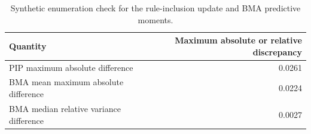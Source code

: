 \begin{table}[htbp]
\centering
\caption{Synthetic enumeration check for the rule-inclusion update and BMA predictive moments.}
\label{tab:synthetic}
\scriptsize
\begin{tabular}{lr}
\toprule
Quantity & Maximum absolute or relative discrepancy \\
\midrule
PIP maximum absolute difference & 0.0261 \\
BMA mean maximum absolute difference & 0.0224 \\
BMA median relative variance difference & 0.0027 \\
\bottomrule
\end{tabular}
\end{table}
